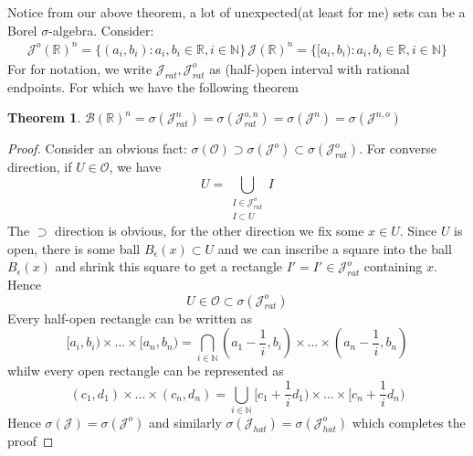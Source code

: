 \documentclass{article}
\newtheorem{theorem}{Theorem}[section]
\theoremstyle{definition}
\theoremstyle{definition}
\newcommand{\m}[1]{$ #1 $}
\begin{document}
Notice from our above theorem, a lot of unexpected(at least for me) sets can be a Borel \m{\sigma}-algebra. Consider: 
\begin{align*}
	\mathscr{J}^{o}(\mathbb{R})^{n} = \{(a_i,b_i):a_i,b_i \in \mathbb{R}, i \in \mathbb{N}\} \,
        \mathscr{J}(\mathbb{R})^{n} = \{[a_i,b_i):a_i,b_i \in \mathbb{R}, i \in \mathbb{N}\} 
\end{align*}
For for notation, we write \m{\mathscr{J}_{rat},\mathscr{J}^{o}_{rat}} as (half-)open interval with rational endpoints. For which we have the following theorem
\begin{theorem}
	\m{\mathscr{B}(\mathbb{R})^n = \sigma(\mathscr{J}^{n}_{rat}) =  \sigma(\mathscr{J}^{o,n}_{rat}) =  \sigma(\mathscr{J}^{n}) =  \sigma(\mathscr{J}^{n,o}) }
\end{theorem}
\begin{proof}
	Consider an obvious fact: \m{\sigma(\mathscr{O}) \supset \sigma(\mathscr{J}^{o}) \subset \sigma(\mathscr{J}^{o}_{rat}) }. For converse direction, if \m{U \in \mathscr{O}}, we have 
	\begin{equation*}
		U = \bigcup_{\substack{I \in \mathscr{J}^{o}_{rat} \\ I \subset U}} I
	\end{equation*}
	The \m{ \supset} direction is obvious, for the other direction we fix some \m{x \in U}. Since \m{U} is open, there is some ball \m{ B_{\epsilon}(x) \subset U} and we can inscribe a square into the ball \m{ B_{\epsilon}(x)} and shrink this square to get a rectangle \m{ I' = I' \in \mathscr{J}^o_{rat}} containing \m{x}. Hence 
	\begin{equation*}
		U \in \mathscr{O} \subset \sigma(\mathscr{J}^{o}_{rat})
	\end{equation*}
	Every half-open rectangle can be written as 
	\begin{equation*}
		[a_i,b_i) \times \dots \times [a_n,b_n) = \bigcap_{i \in \mathbb{N}}(a_1 - \frac{1}{i},b_i) \times \dots \times (a_n - \frac{1}{i},b_n)
	\end{equation*}
	whilw every  open rectangle can be represented as 
	\begin{equation*}
		(c_1,d_1) \times \dots \times (c_n,d_n) = \bigcup_{i \in \mathbb{N}} [c_1 + \frac{1}{i}d_1) \times \dots \times [c_n + \frac{1}{i}d_n)
	\end{equation*}
	Hence \m{\sigma(\mathscr{J}) = \sigma(\mathscr{J}^{o})} and similarly   \m{\sigma(\mathscr{J}_{hat}) = \sigma(\mathscr{J}^{o}_{hat})} which completes the proof
\end{proof}
\end{document}

